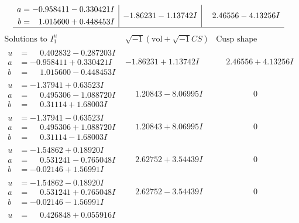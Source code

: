 \documentclass[1p]{elsarticle_modified}
\theoremstyle{definition}
\newcommand{\I}{\sqrt{-1}}
\begin{document}
$$\begin{array}{c|c|c}
\begin{aligned}
a &= -0.958411 - 0.330421 I \\
b &= \phantom{-}1.015600 + 0.448453 I\end{aligned}
 & -1.86231 - 1.13742 I & \phantom{-}2.46556 - 4.13256 I\\
 \hline 
 \end{array}$$\newpage$$\begin{array}{c|c|c}  
\text{Solutions to }I^u_{1}& \I (\text{vol} + \sqrt{-1}CS) & \text{Cusp shape}\\
 \hline 
\begin{aligned}
u &= \phantom{-}0.402832 - 0.287203 I \\
a &= -0.958411 + 0.330421 I \\
b &= \phantom{-}1.015600 - 0.448453 I\end{aligned}
 & -1.86231 + 1.13742 I & \phantom{-}2.46556 + 4.13256 I \\ \hline\begin{aligned}
u &= -1.37941 + 0.63523 I \\
a &= \phantom{-}0.495306 - 1.088720 I \\
b &= \phantom{-}0.31114 + 1.68003 I\end{aligned}
 & \phantom{-}1.20843 - 8.06995 I & \phantom{-0.000000 } 0 \\ \hline\begin{aligned}
u &= -1.37941 - 0.63523 I \\
a &= \phantom{-}0.495306 + 1.088720 I \\
b &= \phantom{-}0.31114 - 1.68003 I\end{aligned}
 & \phantom{-}1.20843 + 8.06995 I & \phantom{-0.000000 } 0 \\ \hline\begin{aligned}
u &= -1.54862 + 0.18920 I \\
a &= \phantom{-}0.531241 - 0.765048 I \\
b &= -0.02146 + 1.56991 I\end{aligned}
 & \phantom{-}2.62752 + 3.54439 I & \phantom{-0.000000 } 0 \\ \hline\begin{aligned}
u &= -1.54862 - 0.18920 I \\
a &= \phantom{-}0.531241 + 0.765048 I \\
b &= -0.02146 - 1.56991 I\end{aligned}
 & \phantom{-}2.62752 - 3.54439 I & \phantom{-0.000000 } 0 \\ \hline\begin{aligned}
u &= \phantom{-}0.426848 + 0.055916 I \\

\end{aligned}
\end{array}$$
\end{document}
